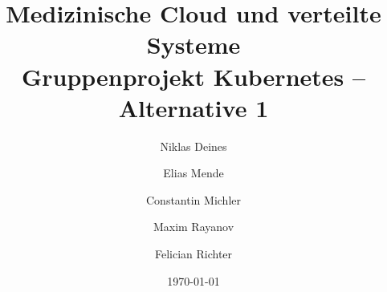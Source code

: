 \documentclass[12pt,a4paper]{article}
\title{Medizinische Cloud und verteilte Systeme \\ Gruppenprojekt Kubernetes – Alternative 1}
\author{Niklas Deines \and Elias Mende \and Constantin Michler \and Maxim Rayanov \and Felician Richter}
\date{\today}
\begin{document}
\nonfrenchspacing
\maketitle
\end{document}
